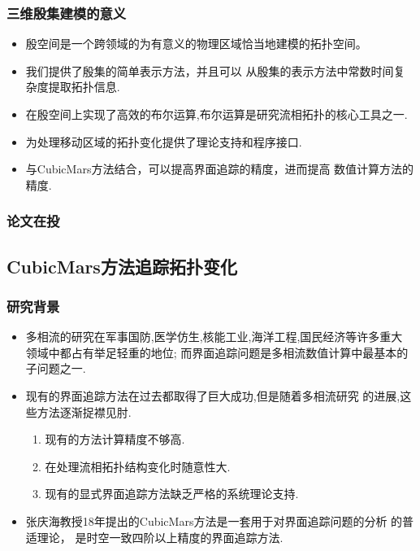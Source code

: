 \documentclass[UTF8]{ctexbeamer}	%
\theoremstyle{plain}
\theoremstyle{definition}
\theoremstyle{remark}
\numberwithin{equation}{section}
\begin{document}
\begin{frame}
    \frametitle{三维殷集建模的意义}
    \begin{itemize}
        \item 殷空间是一个跨领域的为有意义的物理区域恰当地建模的拓扑空间。
        \item 我们提供了殷集的简单表示方法，并且可以
        从殷集的表示方法中常数时间复杂度提取拓扑信息.
        \item 在殷空间上实现了高效的布尔运算,布尔运算是研究流相拓扑的核心工具之一.
        \item 为处理移动区域的拓扑变化提供了理论支持和程序接口.
        \item 与CubicMars方法结合，可以提高界面追踪的精度，进而提高
        数值计算方法的精度.
        \end{itemize}
\end{frame}

\begin{frame}
    \frametitle{论文在投}
\end{frame}

\subsection{CubicMars方法追踪拓扑变化}
\begin{frame}
    \frametitle{研究背景}
    \begin{itemize}
        \item 多相流的研究在军事国防,医学仿生,核能工业,海洋工程,国民经济等许多重大
        领域中都占有举足轻重的地位; 而界面追踪问题是多相流数值计算中最基本的子问题之一.
        \item 现有的界面追踪方法在过去都取得了巨大成功,但是随着多相流研究
        的进展,这些方法逐渐捉襟见肘.
        \begin{enumerate}
            \item 现有的方法计算精度不够高.
            \item 在处理流相拓扑结构变化时随意性大.
            \item 现有的显式界面追踪方法缺乏严格的系统理论支持.
        \end{enumerate}
        \item 张庆海教授18年提出的CubicMars方法是一套用于对界面追踪问题的分析
        的普适理论，
        是时空一致四阶以上精度的界面追踪方法.
    \end{itemize}
    
\end{frame}
\end{document}
